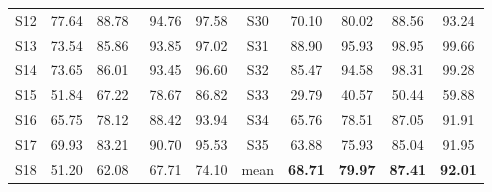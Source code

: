 \documentclass[10pt]{iopart}
\begin{document}
\begin{table*}[htbp]
\begin{center}
\begin{tabular}{c|cccc|c|cccc}
S12           & 77.64 & 88.78\ & 94.76 & 97.58 & S30              & 70.10          & 80.02          & 88.56          & 93.24          \\
S13           & 73.54 & 85.86\ & 93.85 & 97.02 & S31              & 88.90          & 95.93          & 98.95          & 99.66          \\
S14           & 73.65 & 86.01\ & 93.45 & 96.60 & S32              & 85.47          & 94.58          & 98.31          & 99.28          \\
S15           & 51.84 & 67.22\ & 78.67 & 86.82 & S33              & 29.79          & 40.57          & 50.44          & 59.88          \\
S16           & 65.75 & 78.12\ & 88.42 & 93.94 & S34              & 65.76          & 78.51          & 87.05          & 91.91          \\
S17           & 69.93 & 83.21\ & 90.70 & 95.53 & S35              & 63.88          & 75.93          & 85.04          & 91.95          \\
S18           & 51.20 & 62.08\ & 67.71 & 74.10 & mean             & \textbf{68.71} & \textbf{79.97} & \textbf{87.41} & \textbf{92.01} \\ \hline
\end{tabular}
\end{center}
\end{table*}
\end{document}

